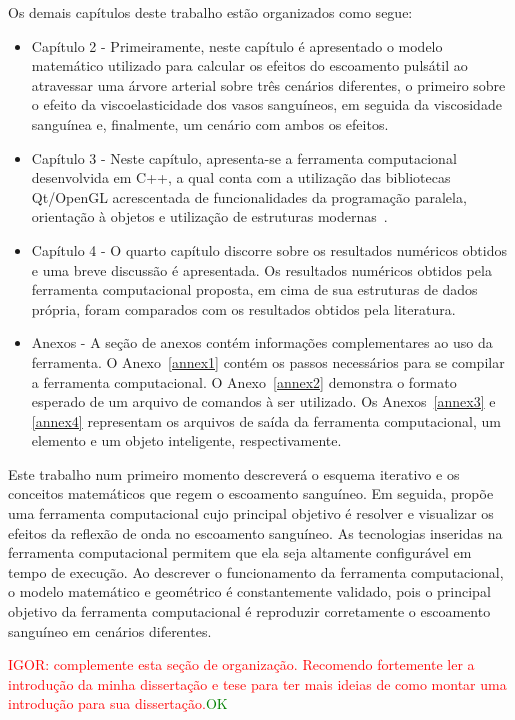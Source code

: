 \documentclass[a4paper,12pt]{monografia}
\theoremstyle{plain}
\theoremstyle{definition}
\theoremstyle{remark}
\begin{document}
Os demais capítulos deste trabalho estão organizados como segue:
\begin{itemize}
	\item Capítulo 2 -
	Primeiramente, neste capítulo é apresentado o modelo matemático utilizado para calcular os efeitos do escoamento pulsátil ao atravessar uma árvore arterial sobre três cenários diferentes, o primeiro sobre o efeito da viscoelasticidade dos vasos sanguíneos, em seguida da viscosidade sanguínea e, finalmente, um cenário com ambos os efeitos.
	
	\item Capítulo 3 -
	Neste capítulo, apresenta-se a ferramenta computacional desenvolvida em C++, a qual conta com a utilização das bibliotecas Qt/OpenGL acrescentada de funcionalidades da programação paralela, orientação à objetos e utilização de estruturas modernas~\cite{factorypattern}.
	
	\item Capítulo 4 -
	O quarto capítulo discorre sobre os resultados numéricos obtidos e uma breve discussão é apresentada. Os resultados numéricos obtidos pela ferramenta computacional proposta, em cima de sua estruturas de dados própria, foram comparados com os resultados obtidos pela literatura.
	
	\item Anexos -
	A seção de anexos contém informações complementares ao uso da ferramenta. O Anexo~\ref{annex1} contém os passos necessários para se compilar a ferramenta computacional. O Anexo~\ref{annex2} demonstra o formato esperado de um arquivo de comandos à ser utilizado. Os Anexos~\ref{annex3} e \ref{annex4} representam os arquivos de saída da ferramenta computacional, um elemento e um objeto inteligente, respectivamente.
\end{itemize}

Este trabalho num primeiro momento descreverá o esquema iterativo e os conceitos matemáticos que regem o escoamento sanguíneo. Em seguida, propõe uma ferramenta computacional cujo principal objetivo é resolver e visualizar os efeitos da reflexão de onda no escoamento sanguíneo. As tecnologias inseridas na ferramenta computacional permitem que ela seja altamente configurável em tempo de execução. Ao descrever o funcionamento da ferramenta computacional, o modelo matemático e geométrico é constantemente validado, pois o principal objetivo da ferramenta computacional é reproduzir corretamente o escoamento sanguíneo em cenários diferentes.

\textcolor{red}{IGOR: complemente esta seção de organização. Recomendo fortemente ler a introdução da minha dissertação e tese para ter mais ideias de como montar uma introdução para sua dissertação.}\textcolor{green}{OK}
\end{document}
